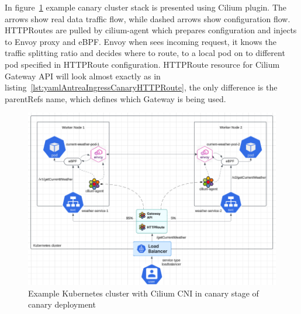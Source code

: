 In figure~\ref{fig:ciliumDataflow} example canary cluster stack is presented using Cilium plugin. The arrows show real data traffic flow, while dashed arrows show configuration flow. HTTPRoutes are pulled by cilium-agent which prepares configuration and injects to Envoy proxy and eBPF. Envoy when sees incoming request, it knows the traffic splitting ratio and decides where to route, to a local pod on to different pod specified in HTTPRoute configuration. HTTPRoute resource for Cilium Gateway API will look almost exactly as in listing~\ref{lst:yamlAntreaIngressCanaryHTTPRoute}, the only difference is the parentRefs name, which defines which Gateway is being used.

\begin{figure}[H]
    \centering
    \includegraphics[width=1\columnwidth]{images/cilium_dataflow.png}
    \caption{Example Kubernetes cluster with Cilium CNI in canary stage of canary deployment}
    \label{fig:ciliumDataflow}
\end{figure}

